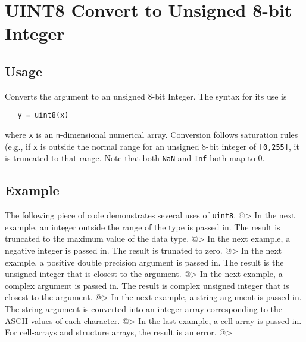 \section{UINT8 Convert to Unsigned 8-bit Integer}

\subsection{Usage}

Converts the argument to an unsigned 8-bit Integer.  The syntax
for its use is
\begin{verbatim}
   y = uint8(x)
\end{verbatim}
where \verb|x| is an \verb|n|-dimensional numerical array.  Conversion
follows saturation rules (e.g., if \verb|x| is outside the normal
range for an unsigned 8-bit integer of \verb|[0,255]|, it is truncated 
to that range. Note that
both \verb|NaN| and \verb|Inf| both map to 0.
\subsection{Example}

The following piece of code demonstrates several uses of \verb|uint8|.
@>
In the next example, an integer outside the range  of the type is passed in.  
The result is truncated to the maximum value of the data type.
@>
In the next example, a negative integer is passed in.  The result is 
trunated to zero.
@>
In the next example, a positive double precision argument is passed in.  
The result is the unsigned integer that is closest to the argument.
@>
In the next example, a complex argument is passed in.  The result is 
complex unsigned integer that is closest to the argument.
@>
In the next example, a string argument is passed in.  The string argument 
is converted into an integer array corresponding to the ASCII values of each character.
@>
In the last example, a cell-array is passed in.  For cell-arrays and 
structure arrays, the result is an error.
@>
